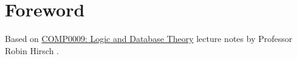 \chapter*{Foreword}

Based on \underline{COMP0009: Logic and Database Theory} lecture notes by
Professor Robin Hirsch \cite{robin_hirsch}.
